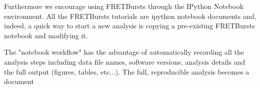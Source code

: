 Furthermore we encourage using FRETBursts through the IPython Notebook
environment. All the FRETBursts tutorials are ipython notebook documents and,
indeed, a quick way to start a new analysis is copying a pre-existing FRETBursts
notebook and modifying it.

The "notebook workflow"\cite{Shen_2014} has the advantage of automatically
recording all the analysis steps including
data file names, software versions, analysis details and the full output
(figures, tables, etc...). The full, reproducible analysis becomes a document 



